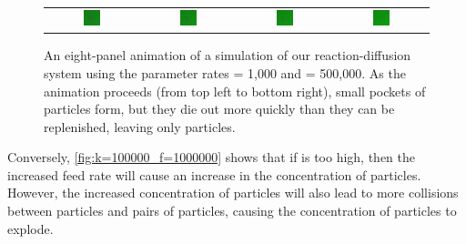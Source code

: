 \begin{figure}[h]
\begin{tabular}{c c c c}
\includegraphics[width = 0.19\textwidth]{../images/predator_prey_predator_dies_f1e1_r5e5_i4} & \includegraphics[width = 0.19\textwidth]{../images/../images/predator_prey_predator_dies_f1e1_r5e5_i5} & \includegraphics[width = 0.19\textwidth]{../images/../images/predator_prey_predator_dies_f1e1_r5e5_i6} & \includegraphics[width = 0.19\textwidth]{../images/../images/predator_prey_predator_dies_f1e1_r5e5_i7}
\end{tabular}
\caption{An eight-panel animation of a simulation of our reaction-diffusion system using the parameter rates  = 1,000 and  = 500,000. As the animation proceeds (from top left to bottom right), small pockets of  particles form, but they die out more quickly than they can be replenished, leaving only  particles.}
\label{fig:k=500000_f=1000}
\end{figure}

Conversely, \autoref{fig:k=100000_f=1000000} shows that if  is too high, then the increased feed rate will cause an increase in the concentration of  particles. However, the increased concentration of  particles will also lead to more collisions between  particles and pairs of  particles, causing the concentration of  particles to explode.\\

